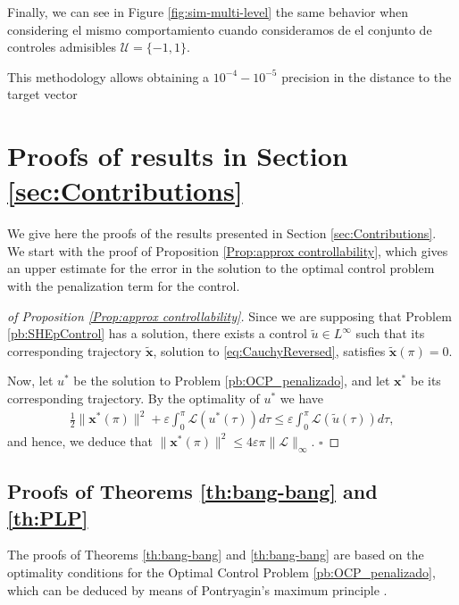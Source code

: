 \documentclass[twocolumn]{autart}    %
\begin{document}
Finally, we can see in Figure \ref{fig:sim-multi-level} the same behavior when considering el mismo comportamiento cuando consideramos de el conjunto de controles admisibles $\mathcal{U} = \{-1,1\}$.
 
This methodology allows obtaining a $10^{-4}-10^{-5}$ precision in the distance to the target vector

\section{Proofs of results in Section \ref{sec:Contributions}}\label{sec:Proof}

We give here the proofs of the results presented in Section \ref{sec:Contributions}. We start with the proof of Proposition \ref{Prop:approx controllability}, which gives an upper estimate for the error in the solution to the optimal control problem with the penalization term for the control. 

\bigskip

\begin{proof}[of Proposition \ref{Prop:approx controllability}]
Since we are supposing that Problem \ref{pb:SHEpControl} has a solution, there exists a control $\tilde{u}\in L^\infty$ such that its corresponding trajectory $\tilde{\bm{x}}$, solution to \eqref{eq:CauchyReversed}, satisfies $\tilde{\bm{x}}(\pi) = 0$. 

Now, let $u^\ast$ be the solution to Problem \ref{pb:OCP_penalizado}, and let $\bm{x}^\ast$ be its corresponding trajectory. By the optimality of $u^\ast$ we have
\begin{align*}
	\frac{1}{2} \| \bm{x}^\ast(\pi)\|^2 +\varepsilon \int_0^\pi \mathcal{L}(u^\ast(\tau))d\tau \leq \varepsilon \int_0^\pi \mathcal{L}(\tilde{u}(\tau))d\tau,
\end{align*}
and hence, we deduce that $\| \bm{x}^\ast (\pi)\|^2 \leq 4 \varepsilon \pi \| \mathcal{L}\|_\infty.$ \hfill $\square$
\end{proof}


\subsection{Proofs of Theorems \ref{th:bang-bang} and \ref{th:PLP}}

The proofs of Theorems \ref{th:bang-bang} and \ref{th:bang-bang} are based on the optimality conditions for the Optimal Control Problem \ref{pb:OCP_penalizado}, which can be deduced by means of Pontryagin's maximum principle \cite[Chapter~2.7]{bryson1975applied}.
\end{document}
